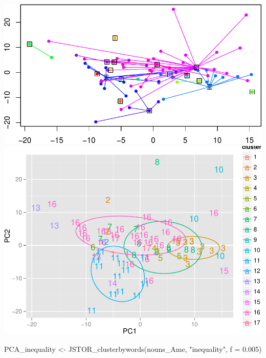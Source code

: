 \documentclass[10pt]{article}
\newenvironment{CodeChunk}{}{}
\begin{document}
\begin{CodeChunk}
\begin{CodeChunk}
\includegraphics{509Assignment_files/figure-latex/onegram3-13} 
\includegraphics{509Assignment_files/figure-latex/onegram3-14} \begin{CodeInput}
PCA_inequality <- JSTOR_clusterbywords(nouns_Ame, "inequality", f = 0.005)
\end{CodeInput}


\end{CodeChunk}
\end{CodeChunk}
\end{document}
